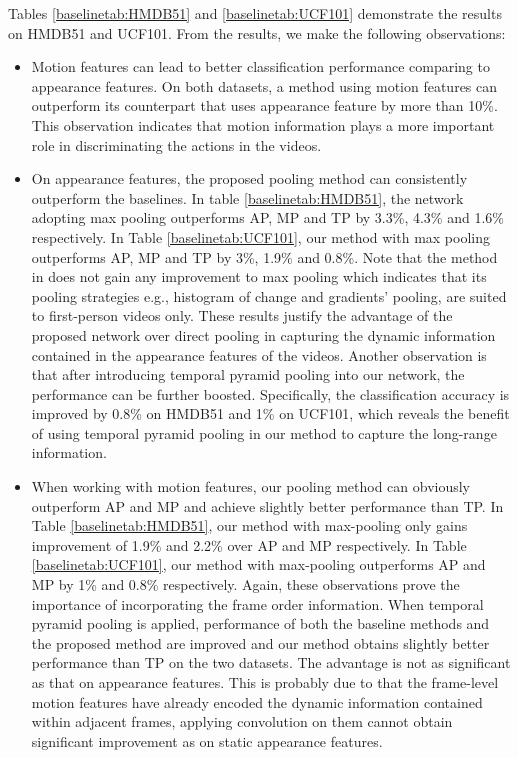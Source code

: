 \documentclass[journal]{IEEEtran}
\begin{document}
Tables \ref{baselinetab:HMDB51} and \ref{baselinetab:UCF101} demonstrate the results on HMDB51 and UCF101. From the results, we make the following observations:
\begin{itemize}
\item Motion features can lead to better classification performance comparing to appearance features. On both datasets, a method using motion features can outperform its counterpart that uses appearance feature by more than 10\%. This observation indicates that motion information plays a more important role in discriminating the actions in the videos.

\item On appearance features, the proposed pooling method can consistently outperform the baselines. In table \ref{baselinetab:HMDB51}, the network adopting max pooling outperforms AP, MP and TP by 3.3\%, 4.3\% and 1.6\% respectively. In Table \ref{baselinetab:UCF101}, our method with max pooling outperforms AP, MP and TP by 3\%, 1.9\% and 0.8\%. Note that the method in \cite{Ryoo_2015_CVPR} does not gain any improvement to max pooling which indicates that its pooling strategies e.g., histogram of change and gradients' pooling, are suited to first-person videos only. These results justify the advantage of the proposed network over direct pooling in capturing the dynamic information contained in the appearance features of the videos. Another observation is that after introducing temporal pyramid pooling into our network, the performance can be further boosted. Specifically, the classification accuracy is improved by 0.8\% on HMDB51 and 1\% on UCF101, which reveals the benefit of using temporal pyramid pooling in our method to capture the long-range information.

\item When working with motion features, our pooling method can obviously outperform AP and MP and achieve slightly better performance than TP. In Table \ref{baselinetab:HMDB51}, our method with max-pooling only gains improvement of 1.9\% and 2.2\% over AP and MP respectively. In Table \ref{baselinetab:UCF101}, our method with max-pooling outperforms AP and MP by 1\% and 0.8\% respectively. Again, these observations prove the importance of incorporating the frame order information. When temporal pyramid pooling is applied, performance of both the baseline methods and the proposed method are improved and our method obtains slightly better performance than TP on the two datasets. The advantage is not as significant as that on appearance features. This is probably due to
that the frame-level motion features have already encoded the dynamic information contained within adjacent frames, applying convolution on them cannot obtain significant improvement as on static appearance features.
\end{itemize}
\end{document}
